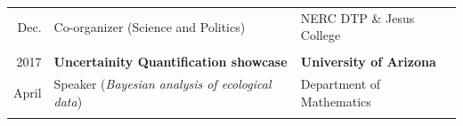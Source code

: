\documentclass[11pt, oneside]{article}   	%
\begin{document}
\begin{tabular}{rll}
Dec. & Co-organizer (Science and Politics) & NERC DTP \& Jesus College\\
\\
2017 & \textbf{Uncertainity Quantification showcase} & \textbf{University of Arizona} \\
April & Speaker (\textit{Bayesian analysis of ecological data}) & Department of Mathematics \\
\\
\end{tabular}
\end{document}
